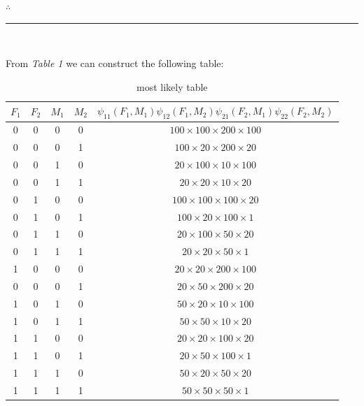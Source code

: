 \documentclass{article}
\begin{document}
\subsubsection*{\normalfont}{$\therefore$ }

\noindent\rule{\textwidth}{0.4pt}\\

\begin{flushleft}
    From \textit{Table 1} we can construct the following table:
\end{flushleft}

\begin{table}[h]
\centering
\begin{tabular}{cccc|c}
\toprule
$F_1$ & $F_2$ & $M_1$ & $M_2$ & $\psi_{11}(F_1,M_1)\psi_{12}(F_1,M_2)\psi_{21}(F_2,M_1)\psi_{22}(F_2,M_2)$ \\
\midrule
0 & 0 & 0 & 0 & $100\times100\times200\times100$ \\
0 & 0 & 0 & 1 & $100\times20\times200\times20$ \\
0 & 0 & 1 & 0 & $20\times100\times10\times100$ \\
0 & 0 & 1 & 1 & $20\times20\times10\times20$ \\
0 & 1 & 0 & 0 & $100\times100\times100\times20$ \\
0 & 1 & 0 & 1 & $100\times20\times100\times1$ \\
0 & 1 & 1 & 0 & $20\times100\times50\times20$ \\
0 & 1 & 1 & 1 & $20\times20\times50\times1$ \\
1 & 0 & 0 & 0 & $20\times20\times200\times100$ \\
0 & 0 & 0 & 1 & $20\times50\times200\times20$ \\
1 & 0 & 1 & 0 & $50\times20\times10\times100$ \\
1 & 0 & 1 & 1 & $50\times50\times10\times20$ \\
1 & 1 & 0 & 0 & $20\times20\times100\times20$ \\
1 & 1 & 0 & 1 & $20\times50\times100\times1$ \\
1 & 1 & 1 & 0 & $50\times20\times50\times20$ \\
1 & 1 & 1 & 1 & $50\times50\times50\times1$ \\
\bottomrule
\end{tabular}

\vspace{1em}
\caption[Most likely Table]{most likely table}
\label{tab:cfg_table}
\end{table}
\end{document}
